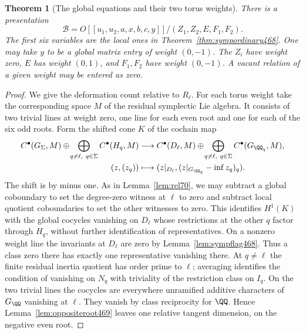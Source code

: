\documentclass[a4paper,11pt]{article}
\newtheorem{theorem}[proposition]{Theorem}
\theoremstyle{definition}
\theoremstyle{remark}
\numberwithin{equation}{section}
\begin{document}
\begin{theorem}[The global equations and their two torus weights]\leavevmode
\label{thm:symprelations469}
There is a presentation
\[
 \mathcal B =
 O[[u_1,u_2,a,x,b,c,y]]/(Z_1,Z_2,E,F_1,F_2).
\]
The first six variables are the local ones in
Theorem~\ref{thm:sympordinary468}. One may take \(y\) to be a
global matrix entry of weight \((0,-1)\). The \(Z_i\) have weight
zero, \(E\) has weight \((0,1)\), and \(F_1,F_2\) have weight
\((0,-1)\). A vacant relation of a given weight may be entered
as zero.
\end{theorem}
\begin{proof}
We give the deformation count relative to \(R_\ell\).
For each torus weight take the corresponding space \(M\) of the
residual symplectic Lie algebra. It consists of two trivial lines
at weight zero, one line for each even root and one for each of
the six odd roots. Form the shifted cone \(K\) of the cochain map
\[
\begin{split}
 C^\bullet(G_\Sigma,M)\oplus\!
       \bigoplus_{q\ne\ell,\ q\in\Sigma} C^\bullet(H_q,M)
       &\longrightarrow C^\bullet(D_\ell,M)\oplus\!
       \bigoplus_{q\ne\ell,\ q\in\Sigma} C^\bullet(G_{\QQ_q},M),\\
 (z,(z_q))&\longmapsto
       (z|_{D_\ell},(z|_{G_{\QQ_q}}-\operatorname{inf}z_q)_q).
\end{split}
\]
The shift is by minus one. As in Lemma~\ref{lem:rel70}, we may
subtract a global coboundary to set the degree-zero witness at
\(\ell\) to zero and subtract local quotient coboundaries to set
the other witnesses to zero. This identifies \(H^1(K)\) with the
global cocycles vanishing on \(D_\ell\) whose restrictions at the
other \(q\) factor through \(H_q\), without further identification
of representatives. On a nonzero weight line the invariants at
\(D_\ell\) are zero by Lemma~\ref{lem:sympflag468}. Thus a class
zero there has exactly one representative vanishing there.
At \(q\ne\ell\) the finite residual inertia quotient has order
prime to \(\ell\); averaging identifies the condition of vanishing
on \(N_q\) with triviality of the restriction class on \(I_q\).
On the two trivial lines the cocycles are everywhere unramified
additive characters of \(G_\QQ\) vanishing at \(\ell\). They
vanish by class reciprocity for \(\QQ\). Hence Lemma~\ref{lem:oppositeroot469}
leaves one relative tangent dimension, on the negative even root.


\end{proof}
\end{document}
